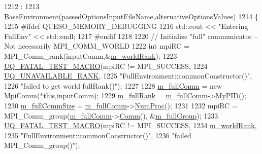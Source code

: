 \begin{DoxyCode}
1212   :
1213   \hyperlink{class_q_u_e_s_o_1_1_base_environment_a8261e797e696fdf379b0532a930db499}{BaseEnvironment}(passedOptionsInputFileName,alternativeOptionsValues)
1214 \{
1215 \textcolor{preprocessor}{#ifdef QUESO\_MEMORY\_DEBUGGING}
1216 \textcolor{preprocessor}{}  std::cout << \textcolor{stringliteral}{"Entering FullEnv"} << std::endl;
1217 \textcolor{preprocessor}{#endif}
1218 \textcolor{preprocessor}{}
1220   \textcolor{comment}{// Initialize "full" communicator -- Not necessarily MPI\_COMM\_WORLD}
1222 \textcolor{comment}{}  \textcolor{keywordtype}{int} mpiRC = MPI\_Comm\_rank(inputComm,&\hyperlink{class_q_u_e_s_o_1_1_base_environment_a464cab923ada0e14c6e3a4000c2ea385}{m\_worldRank});
1223   \hyperlink{_defines_8h_a56d63d18d0a6d45757de47fcc06f574d}{UQ\_FATAL\_TEST\_MACRO}(mpiRC != MPI\_SUCCESS,
1224                       \hyperlink{namespace_q_u_e_s_o_a7d4679800a430ae8e473c1c7bc0bfb21}{UQ\_UNAVAILABLE\_RANK},
1225                       \textcolor{stringliteral}{"FullEnvironment::commonConstructor()"},
1226                       \textcolor{stringliteral}{"failed to get world fullRank()"});
1227 
1228   \hyperlink{class_q_u_e_s_o_1_1_base_environment_a8e80c9067b0875c419f1b9ecccbdb46d}{m\_fullComm} = \textcolor{keyword}{new} MpiComm(*\textcolor{keyword}{this},inputComm);
1229   \hyperlink{class_q_u_e_s_o_1_1_base_environment_a0bfa53f6bdaec0a6aa3dc00ee2c0101f}{m\_fullRank}     = \hyperlink{class_q_u_e_s_o_1_1_base_environment_a8e80c9067b0875c419f1b9ecccbdb46d}{m\_fullComm}->\hyperlink{class_q_u_e_s_o_1_1_mpi_comm_ab806f80f206210723fcb4df8185a55a8}{MyPID}();
1230   \hyperlink{class_q_u_e_s_o_1_1_base_environment_ad5be3e52676db90de1321bc94233c15d}{m\_fullCommSize} = \hyperlink{class_q_u_e_s_o_1_1_base_environment_a8e80c9067b0875c419f1b9ecccbdb46d}{m\_fullComm}->\hyperlink{class_q_u_e_s_o_1_1_mpi_comm_aa780721ae0fdeabc5a15e04cb0cad964}{NumProc}();
1231 
1232   mpiRC = MPI\_Comm\_group(\hyperlink{class_q_u_e_s_o_1_1_base_environment_a8e80c9067b0875c419f1b9ecccbdb46d}{m\_fullComm}->\hyperlink{class_q_u_e_s_o_1_1_mpi_comm_a29d53c01c5ac7ba1bb3a33911d89b6b8}{Comm}(), &\hyperlink{class_q_u_e_s_o_1_1_base_environment_ad455ca08c81b8d953e9a8d2bb14d03c3}{m\_fullGroup});
1233   \hyperlink{_defines_8h_a56d63d18d0a6d45757de47fcc06f574d}{UQ\_FATAL\_TEST\_MACRO}(mpiRC != MPI\_SUCCESS,
1234                       \hyperlink{class_q_u_e_s_o_1_1_base_environment_a464cab923ada0e14c6e3a4000c2ea385}{m\_worldRank},
1235                       \textcolor{stringliteral}{"FullEnvironment::commonConstructor()"},
1236                       \textcolor{stringliteral}{"failed MPI\_Comm\_group()"});

\end{DoxyCode}
